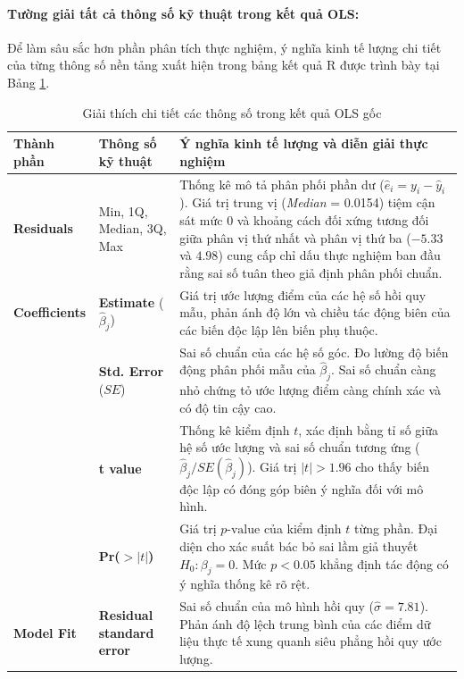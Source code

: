 \documentclass[12pt, a4paper]{article}
\begin{document}
	\paragraph{Tường giải tất cả thông số kỹ thuật trong kết quả OLS:}
	Để làm sâu sắc hơn phần phân tích thực nghiệm, ý nghĩa kinh tế lượng chi tiết của từng thông số nền tảng xuất hiện trong bảng kết quả R được trình bày tại Bảng \ref{tab:ols_full_parameters}.

	\begin{table}[H]
		\centering
		\caption{Giải thích chi tiết các thông số trong kết quả OLS gốc}
		\label{tab:ols_full_parameters}
		\small
		\renewcommand{\arraystretch}{1.3}
		\begin{tabularx}{\textwidth}{l p{3.2cm} X}
			\toprule
			\textbf{Thành phần} & \textbf{Thông số kỹ thuật} & \textbf{Ý nghĩa kinh tế lượng và diễn giải thực nghiệm} \\
			\midrule
			\textbf{Residuals} & Min, 1Q, Median, 3Q, Max & Thống kê mô tả phân phối phần dư ($\hat{e}_i = y_i - \hat{y}_i$). Giá trị trung vị (\textit{Median} = 0.0154) tiệm cận sát mức 0 và khoảng cách đối xứng tương đối giữa phân vị thứ nhất và phân vị thứ ba ($-5.33$ và $4.98$) cung cấp chỉ dấu thực nghiệm ban đầu rằng sai số tuân theo giả định phân phối chuẩn. \\
			\addlinespace
			\textbf{Coefficients} & \textbf{Estimate} ($\hat{\beta}_j$) & Giá trị ước lượng điểm của các hệ số hồi quy mẫu, phản ánh độ lớn và chiều tác động biên của các biến độc lập lên biến phụ thuộc. \\
			\addlinespace
			& \textbf{Std. Error} ($SE$) & Sai số chuẩn của các hệ số góc. Đo lường độ biến động phân phối mẫu của $\hat{\beta}_j$. Sai số chuẩn càng nhỏ chứng tỏ ước lượng điểm càng chính xác và có độ tin cậy cao. \\
			\addlinespace
			& \textbf{t value} & Thống kê kiểm định $t$, xác định bằng tỉ số giữa hệ số ước lượng và sai số chuẩn tương ứng ($\hat{\beta}_j / SE(\hat{\beta}_j)$). Giá trị $|t| > 1.96$ cho thấy biến độc lập có đóng góp biên ý nghĩa đối với mô hình. \\
			\addlinespace
			& \textbf{Pr($>|t|$)} & Giá trị $p\text{-value}$ của kiểm định $t$ từng phần. Đại diện cho xác suất bác bỏ sai lầm giả thuyết $H_0: \beta_j = 0$. Mức $p < 0.05$ khẳng định tác động có ý nghĩa thống kê rõ rệt. \\
			\addlinespace
			\textbf{Model Fit} & \textbf{Residual standard error} & Sai số chuẩn của mô hình hồi quy ($\hat{\sigma} = 7.81$). Phản ánh độ lệch trung bình của các điểm dữ liệu thực tế xung quanh siêu phẳng hồi quy ước lượng. \\

\end{tabularx}
\end{table}
\end{document}
